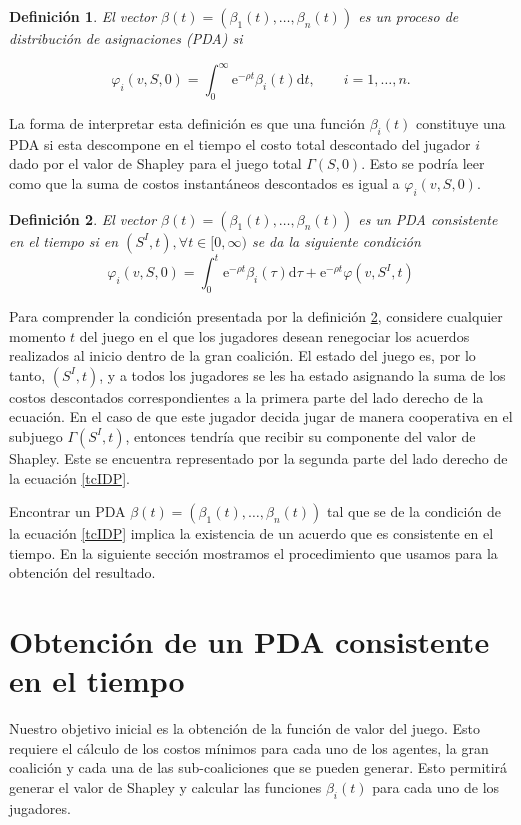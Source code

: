 \documentclass[11pt, oneside]{article}
\newtheorem{definition}{Definición}
\newcommand{\eu}{\ensuremath{\mathrm{e}}}
\newcommand{\du}{\ensuremath{\mathrm{d}}}
\begin{document}
\begin{definition}
El vector $\beta(t) = (\beta_1(t),\dots, \beta_n(t))$ es un \emph{proceso de distribución de asignaciones} (PDA) si 

\begin{equation}
	\varphi_i(v,S,0) = \int_0^\infty \eu^{-\rho t} \beta_i(t) \du t, \qquad  i = 1,\dots,n.
\end{equation}
\end{definition}

La forma de interpretar esta definición es que una función $\beta_i(t)$ constituye una PDA si esta descompone en el tiempo el costo total descontado del jugador $i$ dado por el valor de Shapley para el juego total $\Gamma(S,0)$. Esto se podría leer como que la suma de costos instantáneos descontados es igual a $\varphi_i(v,S,0)$.

\begin{definition}\label{tcIDP}
El vector $\beta(t) = (\beta_1(t),\dots, \beta_n(t))$ es un PDA consistente en el tiempo si en $(S^I, t), \forall t \in [0,\infty)$ se da la siguiente condición
\begin{equation}
	\varphi_i(v,S,0) = \int_0^t \eu^{-\rho t} \beta_i(\tau) \du \tau+ \eu^{-\rho t} \varphi(v, S^I, t)
\end{equation}
\end{definition}

Para comprender la condición presentada por la definición \ref{tcIDP}, considere cualquier momento $t$ del juego en el que los jugadores desean renegociar los acuerdos realizados al inicio dentro de la gran coalición. El estado del juego es, por lo tanto, $(S^I,t)$, y a todos los jugadores se les ha estado asignando la suma de los costos descontados correspondientes a la primera parte del lado derecho de la ecuación. En el caso de que este jugador decida jugar de manera cooperativa en el subjuego $\Gamma(S^I, t)$, entonces tendría que recibir su componente del valor de Shapley. Este se encuentra representado por la segunda parte del lado derecho de la ecuación \eqref{tcIDP}.

Encontrar un PDA $\beta(t) = (\beta_1(t), \dots, \beta_n(t))$ tal que se de la condición de la ecuación \eqref{tcIDP} implica la existencia de un acuerdo que es consistente en el tiempo. En la siguiente sección mostramos el procedimiento que usamos para la obtención del resultado.

\section{Obtención de un PDA consistente en el tiempo}
Nuestro objetivo inicial es la obtención de la función de valor del juego. Esto requiere el cálculo de los costos mínimos para cada uno de los agentes, la gran coalición y cada una de las sub-coaliciones que se pueden generar. Esto permitirá generar el valor de Shapley y calcular las funciones $\beta_i(t)$ para cada uno de los jugadores.
\end{document}
